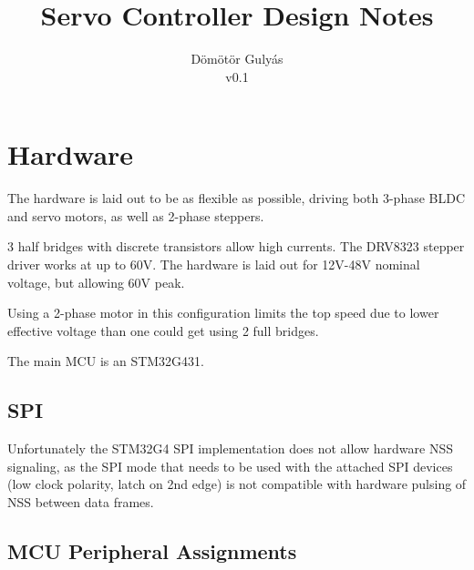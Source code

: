 \documentclass[12pt,a4paper,oneside,openany]{article}
\begin{document}
\title{Servo Controller Design Notes}
\author{Dömötör Gulyás\\v0.1}

\maketitle

%
%
%

\tableofcontents




\section{Hardware}

The hardware is laid out to be as flexible as possible, driving both 3-phase BLDC and servo motors, as well as 2-phase steppers.

3 half bridges with discrete transistors allow high currents. The DRV8323 stepper driver works at up to 60V. The hardware is laid out for 12V-48V nominal voltage, but allowing 60V peak.

Using a 2-phase motor in this configuration limits the top speed due to lower effective voltage than one could get using 2 full bridges.

The main MCU is an STM32G431.

\subsection{SPI}

Unfortunately the STM32G4 SPI implementation does not allow hardware NSS signaling, as the SPI mode that needs to be used with the attached SPI devices (low clock polarity, latch on 2nd edge) is not compatible with hardware pulsing of NSS between data frames.

\subsection{MCU Peripheral Assignments}
\end{document}
